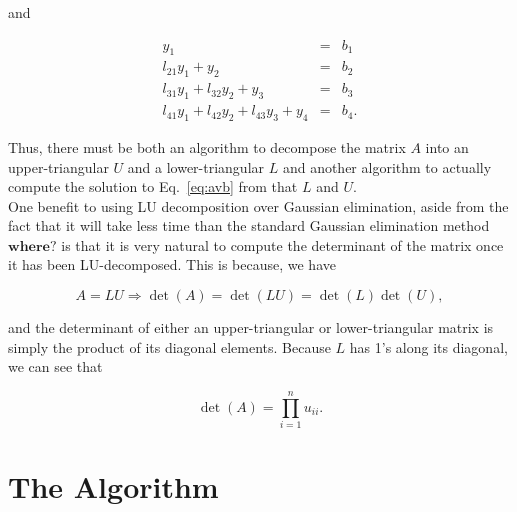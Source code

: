 \documentclass[12pt]{article}
\numberwithin{equation}{section}
\begin{document}
\noindent and

$$\begin{array}{rcc}y_{1}&=&b_{1} \\
l_{21}y_{1}+y_{2}&=&b_{2} \\
l_{31}y_{1}+l_{32}y_{2}+y_{3}&=&b_{3} \\
l_{41}y_{1}+l_{42}y_{2}+l_{43}y_{3}+y_{4}&=&b_{4}.\end{array}$$

\noindent Thus, there must be both an algorithm to decompose the matrix $A$ into an upper-triangular $U$ and a lower-triangular $L$ and another algorithm to actually compute the solution to Eq.~\ref{eq:avb} from that $L$ and $U$.
\\\indent One benefit to using LU decomposition over Gaussian elimination, aside from the fact that it will take less time than the standard Gaussian elimination method $\textbf{where?}$ is that it is very natural to compute the determinant of the matrix once it has been LU-decomposed.  This is because, we have 

$$A=LU \Rightarrow \det\left(A\right)=\det\left(LU\right)=\det\left(L\right)\det\left(U\right),$$

\noindent and the determinant of either an upper-triangular or lower-triangular matrix is simply the product of its diagonal elements.  Because $L$ has 1's along its diagonal, we can see that

\begin{equation}
\det\left(A\right)=\prod_{i=1}^{n}u_{ii}.
\end{equation}

\section{The Algorithm}
\label{sec:algorithm}
\end{document}
